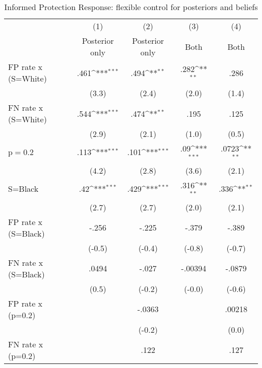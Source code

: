 \begin{table}[htbp]\centering
\def\sym#1{\ifmmode^{#1}\else\(^{#1}\)\fi}
\caption{Informed Protection Response: flexible control for posteriors and beliefs}
\begin{tabular}{l*{4}{c}}
\hline\hline
                &\multicolumn{1}{c}{(1)}&\multicolumn{1}{c}{(2)}&\multicolumn{1}{c}{(3)}&\multicolumn{1}{c}{(4)}\\
                &\multicolumn{1}{c}{Posterior only}&\multicolumn{1}{c}{Posterior only}&\multicolumn{1}{c}{Both}&\multicolumn{1}{c}{Both}\\
\hline
FP rate x (S=White)&     .461\sym{***}&     .494\sym{**} &     .282\sym{**} &     .286         \\
                &    (3.3)         &    (2.4)         &    (2.0)         &    (1.4)         \\
FN rate x (S=White)&     .544\sym{***}&     .474\sym{**} &     .195         &     .125         \\
                &    (2.9)         &    (2.1)         &    (1.0)         &    (0.5)         \\
p$=$0.2         &     .113\sym{***}&     .101\sym{***}&      .09\sym{***}&    .0723\sym{**} \\
                &    (4.2)         &    (2.8)         &    (3.6)         &    (2.1)         \\
S=Black         &      .42\sym{***}&     .429\sym{***}&     .316\sym{**} &     .336\sym{**} \\
                &    (2.7)         &    (2.7)         &    (2.0)         &    (2.1)         \\
FP rate x (S=Black)&    -.256         &    -.225         &    -.379         &    -.389         \\
                &   (-0.5)         &   (-0.4)         &   (-0.8)         &   (-0.7)         \\
FN rate x (S=Black)&    .0494         &    -.027         &  -.00394         &   -.0879         \\
                &    (0.5)         &   (-0.2)         &   (-0.0)         &   (-0.6)         \\
FP rate x (p=0.2)&                  &   -.0363         &                  &   .00218         \\
                &                  &   (-0.2)         &                  &    (0.0)         \\
FN rate x (p=0.2)&                  &     .122         &                  &     .127         \\

\end{tabular}
\end{table}
